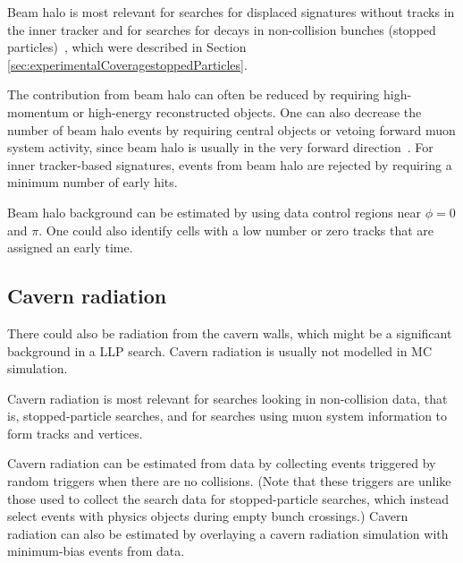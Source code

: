 Beam halo is most relevant for searches for displaced signatures without tracks in the inner tracker and for searches for decays in non-collision bunches (stopped particles)~\cite{Khachatryan:2015jha, Chatrchyan:2012dxa, Khachatryan:2010uf}, which were described in Section \ref{sec:experimentalCoveragestoppedParticles}.

The contribution from beam halo can often be reduced by requiring high-momentum or high-energy reconstructed objects. One can also decrease the number of beam halo events by requiring central objects or vetoing forward muon system activity, since beam halo is usually in the very forward direction~\cite{Khachatryan:2015jha, Chatrchyan:2012dxa, Khachatryan:2010uf}. For inner tracker-based signatures, events from beam halo are rejected by requiring a minimum number of early hits.

Beam halo background can be estimated by using data control regions near $\phi=0$ and $\pi$. One could also identify cells with a low number or zero tracks that are assigned an early time. %

\subsection{Cavern radiation} %

There could also be radiation from the cavern walls, which might be a significant background in a LLP search. %
Cavern radiation is usually not modelled in MC simulation.

Cavern radiation is most relevant for searches looking in non-collision data, that is, stopped-particle searches, and for searches using muon system information to form tracks and vertices.

Cavern radiation can be estimated from data by collecting events triggered by random triggers when there are no collisions. (Note that these triggers are unlike those used to collect the search data for stopped-particle searches, which instead select events with physics objects during empty bunch crossings.) Cavern radiation can also be estimated by overlaying a cavern radiation simulation with minimum-bias events from data.


